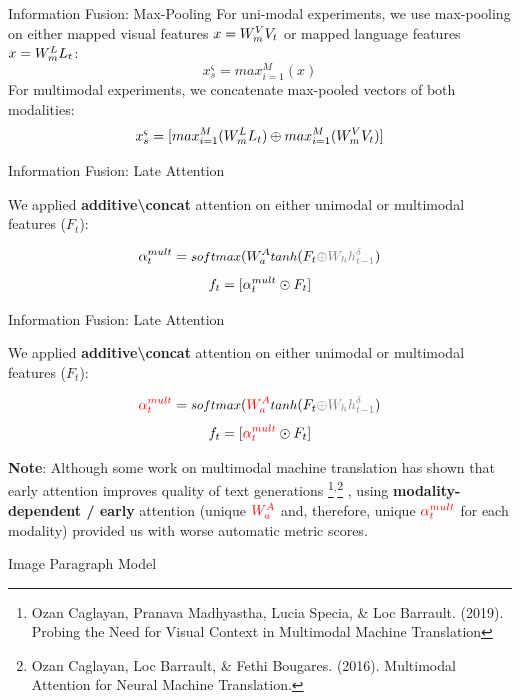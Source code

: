 \documentclass[notes=hide]{beamer}
\begin{document}
\begin{frame}{Information Fusion: Max-Pooling}
For uni-modal experiments, we use max-pooling on either mapped visual features $x=W_{m}\sp{V} V_t$ or mapped language features $x=W_{m}\sp{L} L_t$:
\begin{equation}
x^\varsigma_s = max_{i=1}^M(x)
\end{equation}
\pause
For multimodal experiments, we concatenate max-pooled vectors of both modalities:
\begin{equation}
x^\varsigma_s = [max_{i=1}^M(W_{m}\sp{L} L_t) \oplus max_{i=1}^M(W_{m}\sp{V} V_t)]
\end{equation}
\end{frame}

\begin{frame}{Information Fusion: Late Attention}

We applied \textbf{additive\textbackslash concat} attention on either unimodal or multimodal features ($F_t$):

\begin{equation}
\alpha_t\sp{mult} = \text{\small $softmax$}(W_a\sp{A} \text{\small $tanh$} (F_t\textcolor{gray}{\oplus W_h h\sp{\delta}_{t-1}})
\end{equation}
\begin{equation}
	f_t = [\alpha_t\sp{mult} \odot F_t ]
\end{equation}
\end{frame}

\begin{frame}{Information Fusion: Late Attention}
\small

We applied \textbf{additive\textbackslash concat} attention on either unimodal or multimodal features ($F_t$):

\begin{equation}
\textcolor{red}{ \alpha_t\sp{mult}} = \text{\small $softmax$}( \textcolor{red}{W_a\sp{A}} \text{\small $tanh$} (F_t\textcolor{gray}{\oplus W_h h\sp{\delta}_{t-1}})
\end{equation}
\begin{equation}
	f_t = [ \textcolor{red}{\alpha_t\sp{mult}} \odot F_t ]
\end{equation}

{\vspace{.5cm}\textbf{Note}: Although some work on multimodal machine translation has shown that early attention improves quality of text generations
\footnote{Ozan Caglayan, Pranava Madhyastha, Lucia Specia, \& Loc Barrault. (2019). Probing the Need for Visual Context in Multimodal Machine Translation}$^{,}$\footnote{Ozan Caglayan, Loc Barrault, \& Fethi Bougares. (2016). Multimodal Attention for Neural Machine Translation.}
, using \textbf{modality-dependent / early} attention (unique $\textcolor{red}{W_a\sp{A}}$ and, therefore, unique $\textcolor{red}{ \alpha_t\sp{mult}}$ for each modality) provided us with worse automatic metric scores.}

\end{frame}


\begin{frame}{Image Paragraph Model}

\end{frame}
\end{document}
